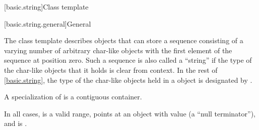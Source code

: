 [basic.string]{Class template }

[basic.string.general]{General}

\pnum
{}%
The
class template
describes objects that can store a sequence consisting of a varying number of
arbitrary char-like objects with the first element of the sequence at position zero.
Such a sequence is also called a ``string'' if the type of the
char-like objects that it holds
is clear from context.
In the rest of \ref{basic.string},
the type of the char-like objects held in a  object
is designated by .

\pnum
A specialization of  is a contiguous container.

\pnum
In all cases,
 is a valid range,
 points at an object with value 
(a ``null terminator''),
and  is .


